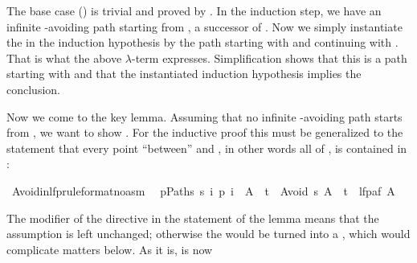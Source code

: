 \begin{isabellebody}
\isamarkupfalse%
\isamarkupfalse%
\isamarkupfalse%
\isamarkupfalse%
\isamarkupfalse%
\isamarkupfalse%
\isamarkupfalse%
%
\begin{isamarkuptext}%
\noindent
The base case () is trivial and proved by .
In the induction step, we have an infinite -avoiding path 
starting from , a successor of . Now we simply instantiate
the  in the induction hypothesis by the path starting with
 and continuing with . That is what the above $\lambda$-term
expresses.  Simplification shows that this is a path starting with  
and that the instantiated induction hypothesis implies the conclusion.

Now we come to the key lemma. Assuming that no infinite -avoiding
path starts from , we want to show . For the
inductive proof this must be generalized to the statement that every point 
``between''  and , in other words all of ,
is contained in :%
\end{isamarkuptext}%
\isamarkuptrue%
\ Avoid{\isacharunderscore}in{\isacharunderscore}lfp{\isacharbrackleft}rule{\isacharunderscore}format{\isacharparenleft}no{\isacharunderscore}asm{\isacharparenright}{\isacharbrackright}{\isacharcolon}\isanewline
\ \ {\isachardoublequote}{\isasymforall}p{\isasymin}Paths\ s{\isachardot}\ {\isasymexists}i{\isachardot}\ p\ i\ {\isasymin}\ A\ {\isasymLongrightarrow}\ t\ {\isasymin}\ Avoid\ s\ A\ {\isasymlongrightarrow}\ t\ {\isasymin}\ lfp{\isacharparenleft}af\ A{\isacharparenright}{\isachardoublequote}\isamarkupfalse%
\isamarkuptrue%
\isamarkupfalse%
\isamarkupfalse%
\isamarkupfalse%
\isamarkupfalse%
\isamarkuptrue%
\isamarkupfalse%
\isamarkupfalse%
\isamarkupfalse%
\isamarkuptrue%
\isamarkupfalse%
\isamarkupfalse%
\isamarkupfalse%
\isamarkupfalse%
\isamarkupfalse%
\isamarkupfalse%
%
\begin{isamarkuptext}%
The  modifier of the  directive in the
statement of the lemma means
that the assumption is left unchanged; otherwise the  
would be turned
into a , which would complicate matters below. As it is,
 is now
\begin{isabelle}%

\end{isabelle}
\end{isamarkuptext}
\end{isabellebody}
